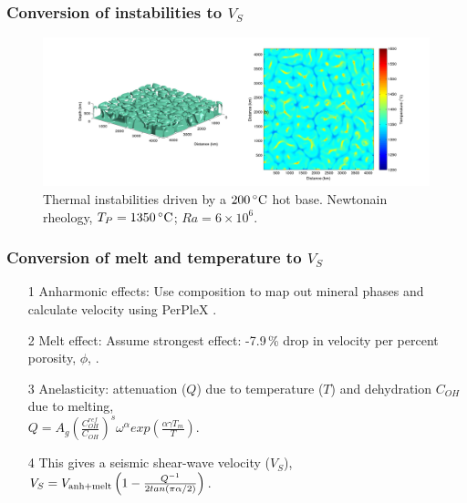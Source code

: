 \documentclass[aspectratio=169]{beamer}
\begin{document}
\begin{frame}
    \frametitle{Conversion of instabilities to $V_{S}$}
    \begin{figure}
        \includegraphics[width=0.85\paperwidth]{./figures/Newt200/dT1.1481_4x4_Newt_Ra6e6_7.png}
        \caption{Thermal instabilities driven by a $200\rm\,^{\circ}C$ hot base. Newtonain rheology, $T_{P}=1350\rm\,^{\circ}C$; $Ra = 6\times10^{6}$.}
    \end{figure}
\end{frame}

\begin{frame}
\frametitle{Conversion of melt and temperature to $V_{S}$}
    \begin{itemize}
    \item[1]{Anharmonic effects: Use composition to map out mineral phases and calculate velocity using PerPleX \citep{connolly-2005}.}
    \item[2]{Melt effect: Assume strongest effect: -7.9\,\% drop in velocity per percent porosity, $\phi$, \citep{hammond-2000}.}
    \item[3]{Anelasticity: attenuation ($Q$) due to temperature ($T$) and dehydration {$C_{OH}$} due to melting, \\ $Q = A_{g}\left(\frac{C^{ref}_{OH}}{C_{OH}}\right)^{s}\omega^{\alpha} exp \left(\frac{\alpha\gamma T_{m}}{T} \right)$.}
    \item[4]{This gives a seismic shear-wave velocity ($V_{S}$), \\ $V_{S} = V_{\rm anh+melt} \left(1 - \frac{Q^{-1}}{2tan(\pi\alpha/2)}\right)$.}
    \end{itemize}
\end{frame}
\end{document}
